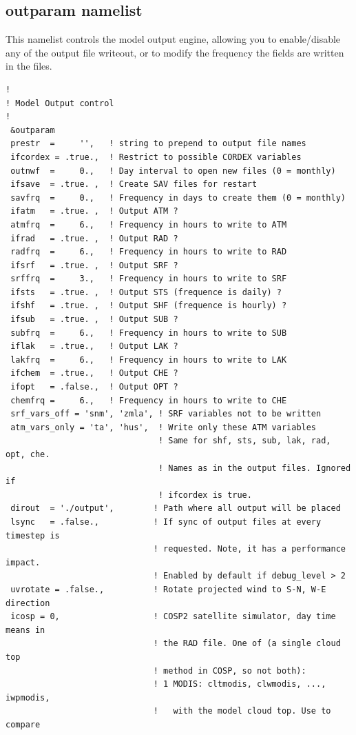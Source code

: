 \subsection{outparam namelist}

This namelist controls the model output engine, allowing you to enable/disable
any of the output file writeout, or to modify the frequency the fields are
written in the files.

{\footnotesize
\begin{Verbatim}
!
! Model Output control
!
 &outparam
 prestr  =     '',   ! string to prepend to output file names
 ifcordex = .true.,  ! Restrict to possible CORDEX variables
 outnwf  =     0.,   ! Day interval to open new files (0 = monthly)
 ifsave  = .true. ,  ! Create SAV files for restart
 savfrq  =     0.,   ! Frequency in days to create them (0 = monthly)
 ifatm   = .true. ,  ! Output ATM ?
 atmfrq  =     6.,   ! Frequency in hours to write to ATM
 ifrad   = .true. ,  ! Output RAD ?
 radfrq  =     6.,   ! Frequency in hours to write to RAD
 ifsrf   = .true. ,  ! Output SRF ?
 srffrq  =     3.,   ! Frequency in hours to write to SRF
 ifsts   = .true. ,  ! Output STS (frequence is daily) ?
 ifshf   = .true. ,  ! Output SHF (frequence is hourly) ?
 ifsub   = .true. ,  ! Output SUB ?
 subfrq  =     6.,   ! Frequency in hours to write to SUB
 iflak   = .true.,   ! Output LAK ?
 lakfrq  =     6.,   ! Frequency in hours to write to LAK
 ifchem  = .true.,   ! Output CHE ?
 ifopt   = .false.,  ! Output OPT ?
 chemfrq =     6.,   ! Frequency in hours to write to CHE
 srf_vars_off = 'snm', 'zmla', ! SRF variables not to be written
 atm_vars_only = 'ta', 'hus',  ! Write only these ATM variables
                               ! Same for shf, sts, sub, lak, rad, opt, che.
                               ! Names as in the output files. Ignored if
                               ! ifcordex is true.
 dirout  = './output',        ! Path where all output will be placed
 lsync   = .false.,           ! If sync of output files at every timestep is
                              ! requested. Note, it has a performance impact.
                              ! Enabled by default if debug_level > 2
 uvrotate = .false.,          ! Rotate projected wind to S-N, W-E direction
 icosp = 0,                   ! COSP2 satellite simulator, day time means in
                              ! the RAD file. One of (a single cloud top
                              ! method in COSP, so not both):
                              ! 1 MODIS: cltmodis, clwmodis, ..., iwpmodis,
                              !   with the model cloud top. Use to compare

\end{Verbatim}}

